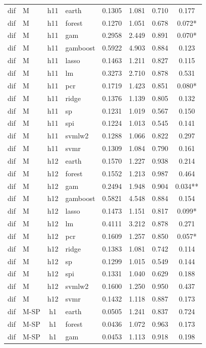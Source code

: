 \begin{ThreePartTable}
\begin{longtable}[t]{llclcccc}
\addlinespace
dif & M & h11 & earth & 0.1305 & 1.081 & 0.710 & 0.177\\
dif & M & h11 & forest & 0.1270 & 1.051 & 0.678 & 0.072*\\
dif & M & h11 & gam & 0.2958 & 2.449 & 0.891 & 0.070*\\
dif & M & h11 & gamboost & 0.5922 & 4.903 & 0.884 & 0.123\\
dif & M & h11 & lasso & 0.1463 & 1.211 & 0.827 & 0.115\\
dif & M & h11 & lm & 0.3273 & 2.710 & 0.878 & 0.531\\
dif & M & h11 & pcr & 0.1719 & 1.423 & 0.851 & 0.080*\\
dif & M & h11 & ridge & 0.1376 & 1.139 & 0.805 & 0.132\\
dif & M & h11 & sp & 0.1231 & 1.019 & 0.567 & 0.150\\
dif & M & h11 & spi & 0.1224 & 1.013 & 0.545 & 0.141\\
dif & M & h11 & svmlw2 & 0.1288 & 1.066 & 0.822 & 0.297\\
dif & M & h11 & svmr & 0.1309 & 1.084 & 0.790 & 0.161\\
\addlinespace
dif & M & h12 & earth & 0.1570 & 1.227 & 0.938 & 0.214\\
dif & M & h12 & forest & 0.1552 & 1.213 & 0.987 & 0.464\\
dif & M & h12 & gam & 0.2494 & 1.948 & 0.904 & 0.034**\\
dif & M & h12 & gamboost & 0.5821 & 4.548 & 0.884 & 0.154\\
dif & M & h12 & lasso & 0.1473 & 1.151 & 0.817 & 0.099*\\
dif & M & h12 & lm & 0.4111 & 3.212 & 0.878 & 0.271\\
dif & M & h12 & pcr & 0.1609 & 1.257 & 0.850 & 0.057*\\
dif & M & h12 & ridge & 0.1383 & 1.081 & 0.742 & 0.114\\
dif & M & h12 & sp & 0.1299 & 1.015 & 0.549 & 0.144\\
dif & M & h12 & spi & 0.1331 & 1.040 & 0.629 & 0.188\\
dif & M & h12 & svmlw2 & 0.1600 & 1.250 & 0.950 & 0.437\\
dif & M & h12 & svmr & 0.1432 & 1.118 & 0.887 & 0.173\\
\addlinespace
dif & M-SP & h1 & earth & 0.0505 & 1.241 & 0.837 & 0.724\\
dif & M-SP & h1 & forest & 0.0436 & 1.072 & 0.963 & 0.173\\
dif & M-SP & h1 & gam & 0.0453 & 1.113 & 0.918 & 0.198\\

\end{longtable}
\end{ThreePartTable}

